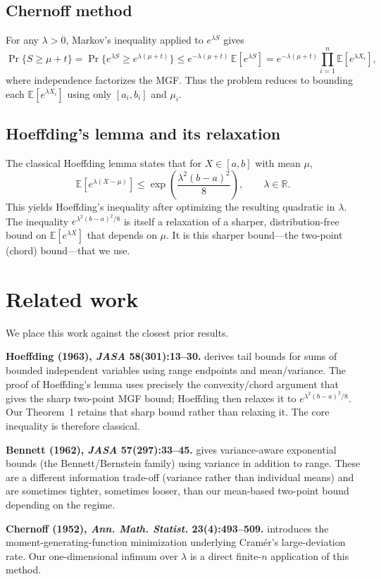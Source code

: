 \documentclass[11pt]{article}
\begin{document}
\subsection{Chernoff method}
For any $\lambda>0$, Markov's inequality applied to $e^{\lambda S}$ gives
\[
\Pr\{S\ge \mu+t\}
=\Pr\{e^{\lambda S}\ge e^{\lambda(\mu+t)}\}
\le e^{-\lambda(\mu+t)}\,\mathbb{E}[e^{\lambda S}]
= e^{-\lambda(\mu+t)}\prod_{i=1}^n \mathbb{E}[e^{\lambda X_i}],
\]
where independence factorizes the MGF. Thus the problem reduces to bounding each $\mathbb{E}[e^{\lambda X_i}]$ using only $[a_i,b_i]$ and $\mu_i$.

\subsection{Hoeffding's lemma and its relaxation}
The classical Hoeffding lemma states that for $X\in[a,b]$ with mean $\mu$,
\[
\mathbb{E}[e^{\lambda(X-\mu)}]\le \exp\!\left(\frac{\lambda^2(b-a)^2}{8}\right),\qquad \lambda\in\mathbb{R}.
\]
This yields Hoeffding's inequality after optimizing the resulting quadratic in $\lambda$. The inequality $e^{\lambda^2(b-a)^2/8}$ is itself a relaxation of a sharper, distribution-free bound on $\mathbb{E}[e^{\lambda X}]$ that depends on $\mu$. It is this sharper bound---the two-point (chord) bound---that we use.

\section{Related work}
We place this work against the closest prior results.

\textbf{Hoeffding (1963), \emph{JASA} 58(301):13--30.} \cite{Hoeffding1963} derives tail bounds for sums of bounded independent variables using range endpoints and mean/variance. The proof of Hoeffding's lemma uses precisely the convexity/chord argument that gives the sharp two-point MGF bound; Hoeffding then relaxes it to $e^{\lambda^2(b-a)^2/8}$. Our Theorem~1 retains that sharp bound rather than relaxing it. The core inequality is therefore classical.

\textbf{Bennett (1962), \emph{JASA} 57(297):33--45.} \cite{Bennett1962} gives variance-aware exponential bounds (the Bennett/Bernstein family) using variance in addition to range. These are a different information trade-off (variance rather than individual means) and are sometimes tighter, sometimes looser, than our mean-based two-point bound depending on the regime.

\textbf{Chernoff (1952), \emph{Ann. Math. Statist.} 23(4):493--509.} \cite{Chernoff1952} introduces the moment-generating-function minimization underlying Cram\'er's large-deviation rate. Our one-dimensional infimum over $\lambda$ is a direct finite-$n$ application of this method.
\end{document}
